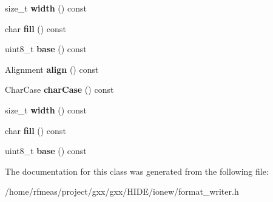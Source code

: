 \begin{DoxyCompactItemize}
\item 
size\+\_\+t {\bfseries width} () const \hypertarget{classgxx_1_1io_1_1EmptySpec_a4ca4033e8409d934c762f5c8c6c13a46}{}\label{classgxx_1_1io_1_1EmptySpec_a4ca4033e8409d934c762f5c8c6c13a46}

\item 
char {\bfseries fill} () const \hypertarget{classgxx_1_1io_1_1EmptySpec_aa5f6882502c0bb1b73785029c4a54072}{}\label{classgxx_1_1io_1_1EmptySpec_aa5f6882502c0bb1b73785029c4a54072}

\item 
uint8\+\_\+t {\bfseries base} () const \hypertarget{classgxx_1_1io_1_1EmptySpec_ad9da604f2910a176e53ba009d0f9fc98}{}\label{classgxx_1_1io_1_1EmptySpec_ad9da604f2910a176e53ba009d0f9fc98}

\item 
Alignment {\bfseries align} () const \hypertarget{classgxx_1_1io_1_1EmptySpec_aea647109fcd983c2dd48a5dd55e768fa}{}\label{classgxx_1_1io_1_1EmptySpec_aea647109fcd983c2dd48a5dd55e768fa}

\item 
Char\+Case {\bfseries char\+Case} () const \hypertarget{classgxx_1_1io_1_1EmptySpec_ac81567b47cbfcf4d96e8d3044f48ccd5}{}\label{classgxx_1_1io_1_1EmptySpec_ac81567b47cbfcf4d96e8d3044f48ccd5}

\item 
size\+\_\+t {\bfseries width} () const \hypertarget{classgxx_1_1io_1_1EmptySpec_a4ca4033e8409d934c762f5c8c6c13a46}{}\label{classgxx_1_1io_1_1EmptySpec_a4ca4033e8409d934c762f5c8c6c13a46}

\item 
char {\bfseries fill} () const \hypertarget{classgxx_1_1io_1_1EmptySpec_aa5f6882502c0bb1b73785029c4a54072}{}\label{classgxx_1_1io_1_1EmptySpec_aa5f6882502c0bb1b73785029c4a54072}

\item 
uint8\+\_\+t {\bfseries base} () const \hypertarget{classgxx_1_1io_1_1EmptySpec_ad9da604f2910a176e53ba009d0f9fc98}{}\label{classgxx_1_1io_1_1EmptySpec_ad9da604f2910a176e53ba009d0f9fc98}

\end{DoxyCompactItemize}


The documentation for this class was generated from the following file\+:\begin{DoxyCompactItemize}
\item 
/home/rfmeas/project/gxx/gxx/\+H\+I\+D\+E/ionew/format\+\_\+writer.\+h\end{DoxyCompactItemize}
